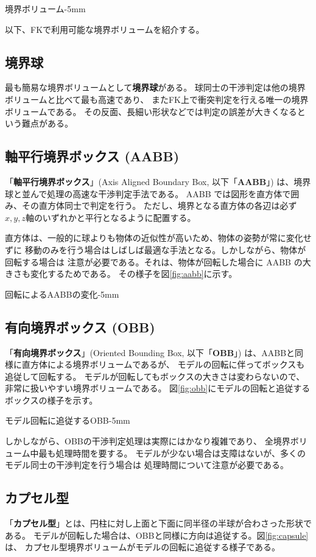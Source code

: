 	{境界ボリューム}{-5mm}

以下、FKで利用可能な境界ボリュームを紹介する。

\subsection{境界球}
最も簡易な境界ボリュームとして\textbf{境界球}がある。
球同士の干渉判定は他の境界ボリュームと比べて最も高速であり、
またFK上で衝突判定を行える唯一の境界ボリュームである。
その反面、長細い形状などでは判定の誤差が大きくなるという難点がある。

\subsection{軸平行境界ボックス (AABB)}
「\textbf{軸平行境界ボックス}」(Axis Aligned Boundary Box, 以下「\textbf{AABB}」)
は、境界球と並んで処理の高速な干渉判定手法である。
AABB では図形を直方体で囲み、その直方体同士で判定を行う。
ただし、境界となる直方体の各辺は必ず \(x,y,z軸\)のいずれかと平行となるように配置する。

直方体は、一般的に球よりも物体の近似性が高いため、物体の姿勢が常に変化せずに
移動のみを行う場合はしばしば最適な手法となる。しかしながら、物体が回転する場合は
注意が必要である。それは、物体が回転した場合に AABB の大きさも変化するためである。
その様子を図\ref{fig:aabb}に示す。

	{回転によるAABBの変化}{-5mm}

\subsection{有向境界ボックス (OBB)}
「\textbf{有向境界ボックス}」(Oriented Bounding Box, 以下「\textbf{OBB}」)
は、AABBと同様に直方体による境界ボリュームであるが、
モデルの回転に伴ってボックスも追従して回転する。
モデルが回転してもボックスの大きさは変わらないので、
非常に扱いやすい境界ボリュームである。
図\ref{fig:obb}にモデルの回転と追従するボックスの様子を示す。

	{モデル回転に追従するOBB}{-5mm}

しかしながら、OBBの干渉判定処理は実際にはかなり複雑であり、
全境界ボリューム中最も処理時間を要する。
モデルが少ない場合は支障はないが、多くのモデル同士の干渉判定を行う場合は
処理時間について注意が必要である。

\subsection{カプセル型}
「\textbf{カプセル型}」とは、円柱に対し上面と下面に同半径の半球が合わさった形状である。
モデルが回転した場合は、OBBと同様に方向は追従する。図\ref{fig:capsule}は、
カプセル型境界ボリュームがモデルの回転に追従する様子である。

